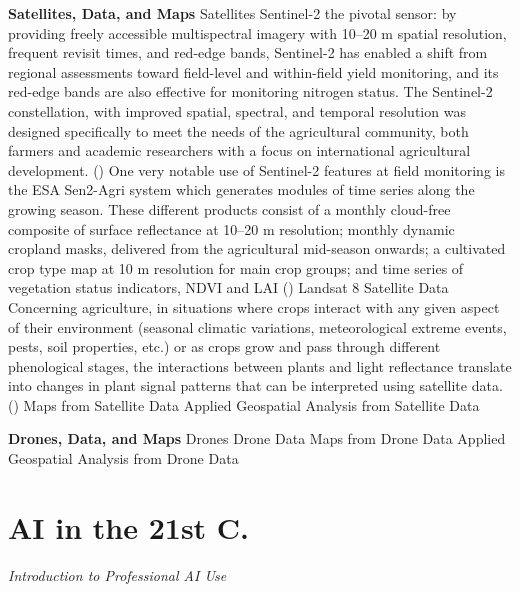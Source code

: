 \documentclass[12pt, letterpaper]{article}
\begin{document}
\begin{outline}[enumerate]

\1 \textbf{Satellites, Data, and Maps}
\2 Satellites
\3 Sentinel-2
\4 the pivotal sensor: by providing freely accessible multispectral imagery with 10–20 m spatial resolution, frequent revisit times, and red-edge bands, Sentinel-2 has enabled a shift from regional assessments toward field-level and within-field yield monitoring, and its red-edge bands are also effective for monitoring nitrogen status. The Sentinel-2 constellation, with improved spatial, spectral, and temporal resolution was designed specifically to meet the needs of the agricultural community, both farmers and academic researchers with a focus on international agricultural development. (\cite{segarra_remote_2020})
\4 One very notable use of Sentinel-2 features at field monitoring is the ESA Sen2-Agri system which generates modules of time series along the growing season. These different products consist of a monthly cloud-free composite of surface reflectance at 10–20 m resolution; monthly dynamic cropland masks, delivered from the agricultural mid-season onwards; a cultivated crop type map at 10 m resolution for main crop groups; and time series of vegetation status indicators, NDVI and LAI (\cite{segarra_remote_2020})
\3 Landsat 8
\2 Satellite Data
\3 Concerning agriculture, in situations where crops interact with any given aspect of their environment (seasonal climatic variations, meteorological extreme events, pests, soil properties, etc.) or as crops grow and pass through different phenological stages, the interactions between plants and light reflectance translate into changes in plant signal patterns that can be interpreted using satellite data.(\cite{segarra_remote_2020})
\2 Maps from Satellite Data
\3 
\2 Applied Geospatial Analysis from Satellite Data
\3

\1 \textbf{Drones, Data, and Maps}
\2 Drones
\3
\2 Drone Data
\3 
\2 Maps from Drone Data
\3
\2 Applied Geospatial Analysis from Drone Data
\end{outline}

\section{AI in the 21st C.}

\large
\begin{flushleft}
\textit{Introduction to Professional AI Use}
\end{flushleft}
\normalsize
\end{document}
